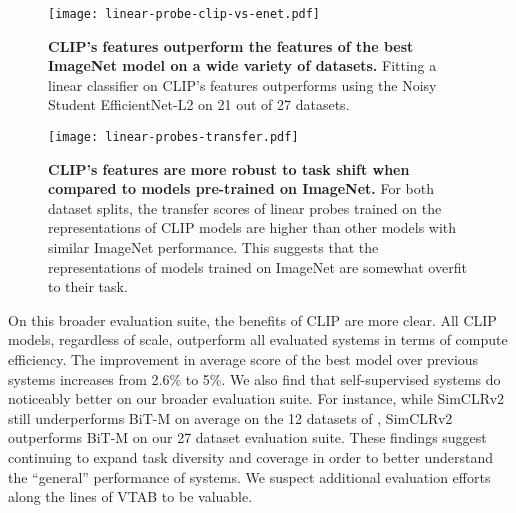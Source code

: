 \documentclass{article}
\begin{document}
\begin{figure}[t]
\begin{center}
\centerline{\texttt{[image: linear-probe-clip-vs-enet.pdf]}}
\caption{\textbf{CLIP's features outperform the features of the best ImageNet model on a wide variety of datasets.} Fitting a linear classifier on CLIP's features outperforms using the Noisy Student EfficientNet-L2 on 21 out of 27 datasets.}
\label{linear-probe-clip-vs-enet}
\end{center}
\vspace{-1cm}
\end{figure}
\begin{figure*}[t]
\texttt{[image: linear-probes-transfer.pdf]}
\vspace{-2em}
\caption{\textbf{CLIP's features are more robust to task shift when compared to models pre-trained on ImageNet.}
For both dataset splits, the transfer scores of linear probes trained on the representations of CLIP models are higher than other models with similar ImageNet performance. This suggests that the representations of models trained on ImageNet are somewhat overfit to their task. }
\label{fig:linear-probe-transfer}
\end{figure*}

On this broader evaluation suite, the benefits of CLIP are more clear. All CLIP models, regardless of scale, outperform all evaluated systems in terms of compute efficiency. The improvement in average score of the best model over previous systems increases from 2.6\% to 5\%. We also find that self-supervised systems do noticeably better on our broader evaluation suite. For instance, while SimCLRv2 still underperforms BiT-M on average on the 12 datasets of \citet{kornblith2019better}, SimCLRv2 outperforms BiT-M on our 27 dataset evaluation suite. These findings suggest continuing to expand task diversity and coverage in order to better understand the ``general'' performance of systems. We suspect additional evaluation efforts along the lines of VTAB to be valuable.
\end{document}
